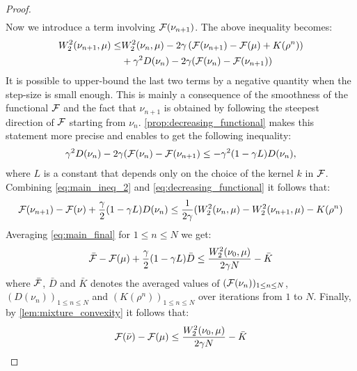 \begin{proof}
\begin{align}
\end{align}
Now we introduce a term involving ${{\mathcal F}}(\nu_{n+1})$. The above inequality becomes:
\begin{align}
	W_2^2(\nu_{n+1},\mu)\leq & W_2^2(\nu_{n},\mu) - 2\gamma\left({{\mathcal F}}(\nu_{n+1})- {{\mathcal F}}(\mu) +K(\rho^n)\right) \\
		&+\gamma^2 D(\nu_n) -2\gamma ({{\mathcal F}}(\nu_n)-{{\mathcal F}}(\nu_{n+1}))
	\label{eq:main_ineq_2}
\end{align}
It is possible to upper-bound the last two terms by a negative quantity when the step-size is small enough. This is mainly a consequence of the smoothness of the functional ${{\mathcal F}}$ and the fact that $\nu_{n+1}$ is obtained by following the steepest direction of ${{\mathcal F}}$ starting from $\nu_n$. \cref{prop:decreasing_functional} makes this statement more precise and enables to get the following inequality:
\begin{align}
	\gamma^2 D(\nu_n) -2\gamma ({{\mathcal F}}(\nu_n)-{{\mathcal F}}(\nu_{n+1})\leq -\gamma^2 (1-\gamma L)D(\nu_n),
	\label{eq:decreasing_functional}
\end{align}
where $L$ is a constant that depends only on the choice of the kernel $k$ in ${{\mathcal F}}$. Combining  \cref{eq:main_ineq_2} and \cref{eq:decreasing_functional} it follows that:
\begin{align}
{{\mathcal F}}(\nu_{n+1})-{{\mathcal F}}(\nu)+\frac{\gamma}{2}(1-\gamma L)D(\nu_n)
\leq 
\frac{1}{2\gamma} (W_2^2(\nu_n,\mu)-W_2^2(\nu_{n+1},\mu)-K(\rho^n)
\label{eq:main_final}
\end{align}
Averaging \cref{eq:main_final} for $1\leq n\leq N$ we get:
\begin{align}
	\bar{{{\mathcal F}}}-{{\mathcal F}}(\mu)+\frac{\gamma}{2}(1-\gamma L)\bar{D} \leq \frac{W_2^2(\nu_0,\mu)}{2 \gamma N} -\bar{K}
\end{align}
where $\bar{{{\mathcal F}}}$, $\bar{D}$ and $\bar{K}$ denotes the averaged values of $({{\mathcal F}}(\nu_n))_{1\leq n \leq N}$, $(D(\nu_n))_{1\leq n \leq N}$  and $(K(\rho^n))_{1\leq n \leq N}$ over iterations from $1$ to $N$. Finally, by \cref{lem:mixture_convexity} it follows that:
\begin{align}
{{\mathcal F}}(\bar{\nu})-{{\mathcal F}}(\mu)\leq  \frac{W_2^2(\nu_0,\mu)}{2 \gamma N} -\bar{K}
\end{align}
\end{proof}





